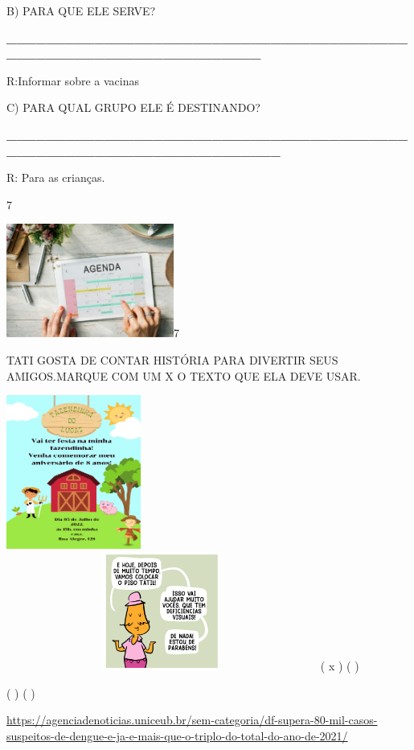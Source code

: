 {{B) PARA QUE ELE SERVE?

\textbf{\_\_\_\_\_\_\_\_\_\_\_\_\_\_\_\_\_\_\_\_\_\_\_\_\_\_\_\_\_\_\_\_\_\_\_\_\_\_\_\_\_\_\_\_\_\_\_\_\_\_\_\_\_\_\_\_\_\_\_\_\_\_\_\_\_\_\_}

R:Informar sobre a vacinas

C) PARA QUAL GRUPO ELE É DESTINANDO?

\textbf{\_\_\_\_\_\_\_\_\_\_\_\_\_\_\_\_\_\_\_\_\_\_\_\_\_\_\_\_\_\_\_\_\_\_\_\_\_\_\_\_\_\_\_\_\_\_\_\_\_\_\_\_\_\_\_\_\_\_\_\_\_\_\_\_\_\_\_\_\_}

R: Para as crianças.

\num{7}

{\texorpdfstring{\protect\includegraphics[width=2.16667in,height=1.47014in]{media/image108.jpeg}7
}{7 }}\label{section-48}

TATI GOSTA DE CONTAR HISTÓRIA PARA DIVERTIR SEUS AMIGOS.MARQUE COM UM X
O TEXTO QUE ELA DEVE USAR.

\includegraphics[width=1.73819in,height=1.98472in]{media/image109.png}\includegraphics[width=4.02222in,height=1.52917in]{media/image110.png}
( x ) ( )

( ) ( )

\url{https://agenciadenoticias.uniceub.br/sem-categoria/df-supera-80-mil-casos-suspeitos-de-dengue-e-ja-e-mais-que-o-triplo-do-total-do-ano-de-2021/}

}}

